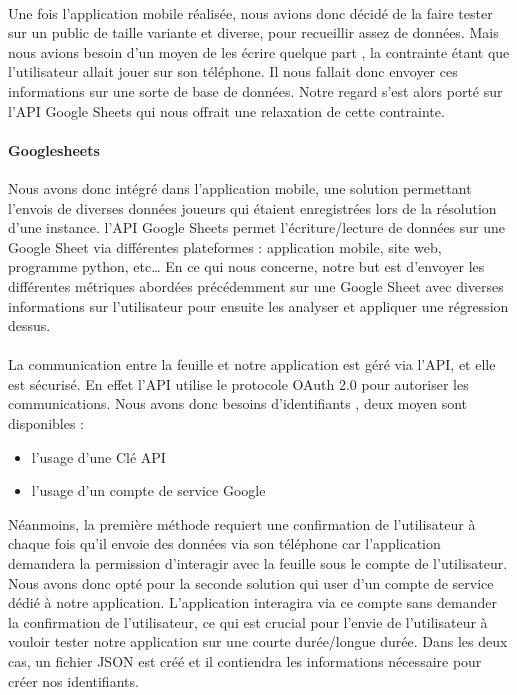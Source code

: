 \documentclass[../main.tex]{subfiles}
\begin{document}
	\paragraph{}
Une fois l’application mobile réalisée, nous avions donc décidé de la faire tester sur un public de taille variante et diverse, pour recueillir assez de données. Mais nous avions besoin d’un moyen de les écrire quelque part , la contrainte étant que l’utilisateur allait jouer sur son téléphone. Il nous fallait donc envoyer ces informations sur une sorte de base de données. Notre regard s’est alors porté sur l’API Google Sheets qui nous offrait une relaxation de cette contrainte.

\paragraph{Googlesheets}
Nous avons donc intégré dans l’application mobile, une solution permettant l’envois de diverses données joueurs qui étaient enregistrées lors de la résolution d’une instance. l’API Google Sheets permet l’écriture/lecture de données sur une Google Sheet via différentes plateformes : application mobile, site web, programme python, etc… 
En ce qui nous concerne, notre but est d’envoyer les différentes métriques abordées précédemment sur une Google Sheet avec diverses informations sur l’utilisateur pour ensuite les analyser et appliquer une régression dessus.

\paragraph{}
La communication entre la feuille et notre application est géré via l’API, et elle est sécurisé. En effet l’API utilise le protocole OAuth 2.0 pour autoriser les communications. Nous avons donc besoins d’identifiants , deux moyen sont disponibles :
 \begin{itemize}
\item l’usage d’une Clé API
\item l’usage d’un compte de service Google
\end{itemize}
Néanmoins, la première méthode requiert une confirmation de l’utilisateur à chaque fois qu’il envoie des données via son téléphone car l’application demandera la permission d'interagir avec la feuille sous le compte de l’utilisateur. Nous avons donc opté pour la seconde solution qui user d’un compte de service dédié à notre application. L’application interagira via ce compte sans demander la confirmation de l’utilisateur, ce qui est crucial pour l’envie de l’utilisateur à vouloir tester notre application sur une courte durée/longue durée.
Dans les deux cas, un fichier JSON est créé et il contiendra les informations nécessaire pour créer nos identifiants.
\end{document}
